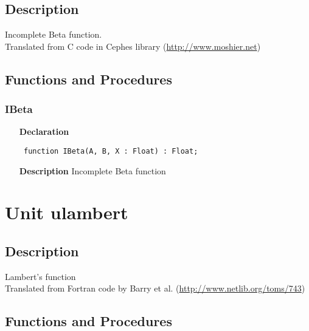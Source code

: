 \documentclass[12pt,a4paper,oneside]{report}
\newcommand{\declarationitem}[1]{\textbf{#1}}
\newcommand{\descriptiontitle}[1]{\textbf{#1}}
\newcommand{\code}[1]{\texttt{#1}}
\begin{document}
\subsection{Description}
Incomplete Beta function.\\ Translated from C code in Cephes library (\href{http://www.moshier.net}{http://www.moshier.net}) \subsection{Functions and Procedures}
\subsubsection{IBeta}
\label{uibeta-IBeta}
\begin{itemize}\item[\declarationitem{Declaration}\hfill]
	\begin{flushleft}
		\code{
			function IBeta(A, B, X : Float) : Float;}
		
	\end{flushleft}
	
	\par
	\item[\descriptiontitle{Description}]
	Incomplete Beta function
	
\end{itemize}
\section{Unit ulambert}
\label{ulambert}
\subsection{Description}
Lambert's function \\Translated from Fortran code by Barry et al. (\href{http://www.netlib.org/toms/743}{http://www.netlib.org/toms/743}) 
\subsection{Functions and Procedures}
\end{document}
